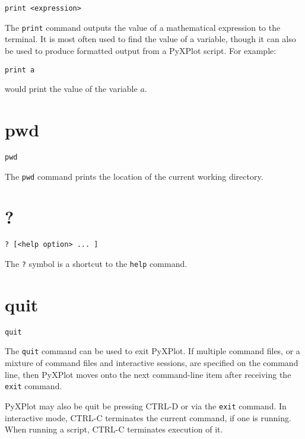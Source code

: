 \begin{verbatim}
print <expression>
\end{verbatim}

The {\tt print} command outputs the value of a mathematical expression to the
terminal.  It is most often used to find the value of a variable, though it can
also be used to produce formatted output from a PyXPlot script. For example:

\begin{verbatim}
print a
\end{verbatim}

\noindent would print the value of the variable $a$.


\section{pwd}

\begin{verbatim}
pwd
\end{verbatim}

The {\tt pwd} command prints the location of the current working directory.


\section{?}

\begin{verbatim}
? [<help option> ... ]
\end{verbatim}

The {\tt ?} symbol is a shortcut to the {\tt help} command.


\section{quit}

\begin{verbatim}
quit
\end{verbatim}

The {\tt quit} command can be used to exit PyXPlot. If multiple command files,
or a mixture of command files and interactive sessions, are specified on the
command line, then PyXPlot moves onto the next command-line item after receiving
the {\tt exit} command.

PyXPlot may also be quit be pressing CTRL-D or via the {\tt exit} command. In
interactive mode, CTRL-C terminates the current command, if one is running.
When running a script, CTRL-C terminates execution of it.



